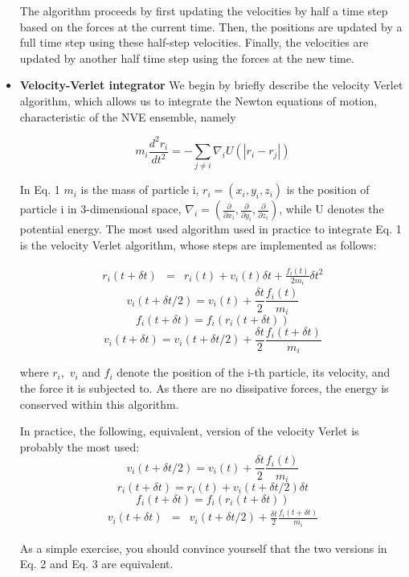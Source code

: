 \documentclass[a4paper,10pt]{article}
\begin{document}
\begin{itemize}
The algorithm proceeds by first updating the velocities by half a time step based on the forces at the current time. Then, the positions are updated by a full time step using these half-step velocities. Finally, the velocities are updated by another half time step using the forces at the new time.

\item \textbf{Velocity-Verlet integrator}
We begin by briefly describe the velocity Verlet algorithm, which allows us to integrate the Newton equations of motion, 
characteristic of the NVE ensemble, namely

$$m_{i}\frac{d^{2}r_{i}}{dt^{2}}=-\sum_{j\ne i}\nabla_{i}U(|r_{i}-r_{j}|)$$

In Eq. 1 $m_{i}$ is the mass of particle i, $r_{i}=(x_{i},y_{i},z_{i})$ is the position of particle
i in 3-dimensional space, $\nabla_{i}=(\frac{\partial}{\partial x_{i}},\frac{\partial}{\partial y_{i}},\frac{\partial}{\partial z_{i}})$, 
while U denotes the potential energy. The most used algorithm used in practice to integrate Eq. 1 is the velocity Verlet 
algorithm, whose steps are implemented as follows:

$$\begin{matrix}r_{i}(t+\delta t)&=&r_{i}(t)+v_{i}(t)\delta t+\frac{f_{i}(t)}{2m_{i}}\delta t^{2}\end{matrix}$$
$$v_{i}(t+\delta t/2)=v_{i}(t)+\frac{\delta t}{2}\frac{f_{i}(t)}{m_{i}}$$
$$f_{i}(t+\delta t)=f_{i}(r_{i}(t+\delta t))$$
$$v_{i}(t+\delta t)=v_{i}(t+\delta t/2)+\frac{\delta t}{2}\frac{f_{i}(t+\delta t)}{m_{i}}$$

where $r_{i},$ $v_{i}$ and $f_{i}$ denote the position of the i-th particle, its velocity, and the force it is 
subjected to.  As there are no dissipative forces, the energy is conserved within this algorithm. 

In practice, the following, equivalent, version of the velocity Verlet is probably the most used: 
$$v_{i}(t+\delta t/2)=v_{i}(t)+\frac{\delta t}{2}\frac{f_{i}(t)}{m_{i}}$$
$$r_{i}(t+\delta t)=r_{i}(t)+v_{i}(t+\delta t/2)\delta t$$
$$f_{i}(t+\delta t)=f_{i}(r_{i}(t+\delta t))$$
$$\begin{matrix}v_{i}(t+\delta t)&=&v_{i}(t+\delta t/2)+\frac{\delta t}{2}\frac{f_{i}(t+\delta t)}{m_{i}}\end{matrix}$$

As a simple exercise, you should convince yourself that the two versions in Eq. 2 and Eq. 3 are equivalent.


\end{itemize}
\end{document}
